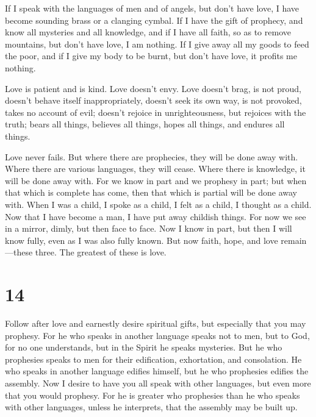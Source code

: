  If I speak with the languages of men and of angels, but
don't have love, I have become sounding brass or a clanging cymbal.
 If I have the gift of prophecy, and know all mysteries
and all knowledge, and if I have all faith, so as to remove mountains,
but don't have love, I am nothing.  If I give away all my
goods to feed the poor, and if I give my body to be burnt, but don't
have love, it profits me nothing.

 Love is patient and is kind. Love doesn't envy. Love
doesn't brag, is not proud,  doesn't behave itself
inappropriately, doesn't seek its own way, is not provoked, takes no
account of evil;  doesn't rejoice in unrighteousness, but
rejoices with the truth;  bears all things, believes all
things, hopes all things, and endures all things.

 Love never fails. But where there are prophecies, they
will be done away with. Where there are various languages, they will
cease. Where there is knowledge, it will be done away with.
 For we know in part and we prophesy in part;
 but when that which is complete has come, then that
which is partial will be done away with.  When I was a
child, I spoke as a child, I felt as a child, I thought as a child. Now
that I have become a man, I have put away childish things.
 For now we see in a mirror, dimly, but then face to
face. Now I know in part, but then I will know fully, even as I was also
fully known.  But now faith, hope, and love
remain---these three. The greatest of these is love.

\hypertarget{section-13}{%
\section{14}\label{section-13}}

 Follow after love and earnestly desire spiritual gifts,
but especially that you may prophesy.  For he who speaks
in another language speaks not to men, but to God, for no one
understands, but in the Spirit he speaks mysteries.  But
he who prophesies speaks to men for their edification, exhortation, and
consolation.  He who speaks in another language edifies
himself, but he who prophesies edifies the assembly.  Now
I desire to have you all speak with other languages, but even more that
you would prophesy. For he is greater who prophesies than he who speaks
with other languages, unless he interprets, that the assembly may be
built up.

